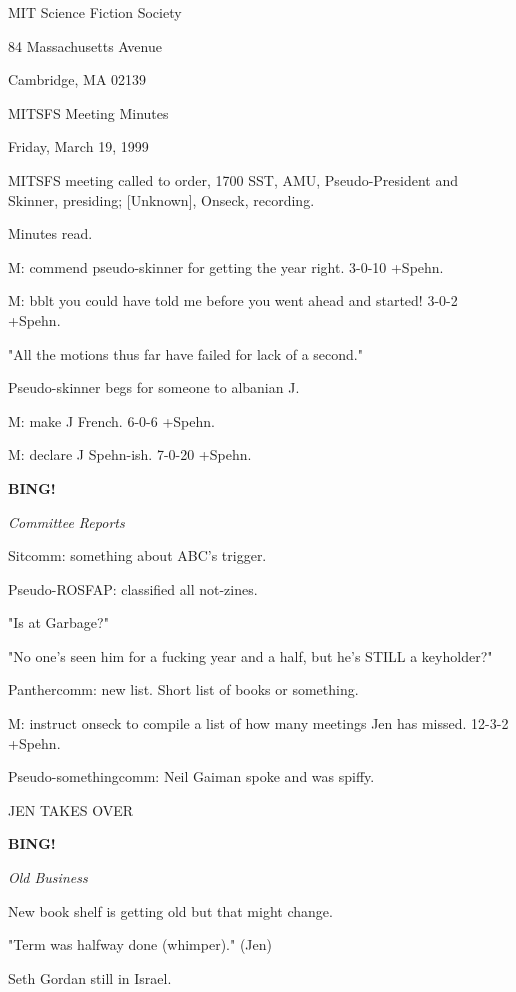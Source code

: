 \documentclass[12pt]{article}
\newcommand{\bing}{{\bf BING!} }
\newcommand{\goto}[1]{\bing \vskip 12pt \centerline{{\em{#1}}}}
\begin{document}
\begin{center}

MIT Science Fiction Society 

84 Massachusetts Avenue

Cambridge, MA 02139

\vspace{12pt}

MITSFS Meeting Minutes 

Friday, March 19, 1999

\end{center}
 
\vspace{18pt}

\setlength{\parskip}{6pt}

\noindent
MITSFS meeting called to order, 1700 SST,
AMU, Pseudo-President and Skinner, presiding; [Unknown], Onseck, recording.

Minutes read.

M: commend pseudo-skinner for getting the year right. 3-0-10 +Spehn.

M: bblt you could have told me before you went ahead and started! 3-0-2 +Spehn.

"All the motions thus far have failed for lack of a second."

Pseudo-skinner begs for someone to albanian J.

M: make J French. 6-0-6 +Spehn.

M: declare J Spehn-ish. 7-0-20 +Spehn.

\goto{Committee Reports}

Sitcomm: something about ABC's trigger.

Pseudo-ROSFAP: classified all not-zines.

"Is at Garbage?"

"No one's seen him for a fucking year and a half, but he's STILL a keyholder?"

Panthercomm: new list. Short list of books or something.

M: instruct onseck to compile a list of how many meetings Jen has missed. 12-3-2 +Spehn.

Pseudo-somethingcomm: Neil Gaiman spoke and was spiffy.

JEN TAKES OVER

\goto{Old Business}

New book shelf is getting old but that might change.

"Term was halfway done (whimper)." (Jen)

Seth Gordan still in Israel.
\end{document}
